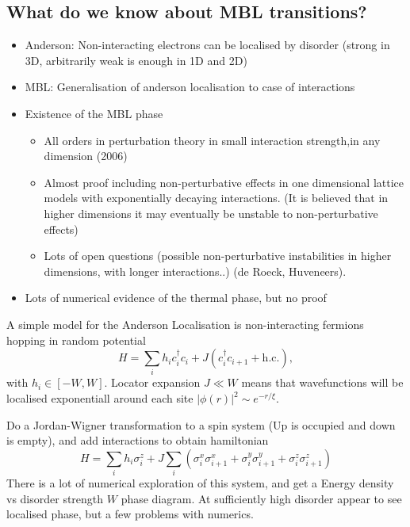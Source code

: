 \documentclass[a4paper]{article}
\begin{document}
\subsection{What do we know about MBL transitions?}
\begin{itemize}
    \item Anderson: Non-interacting electrons can be localised by disorder
        (strong in 3D, arbitrarily weak is enough in 1D and 2D)
    \item MBL: Generalisation of anderson localisation to case of interactions
    \item Existence of the MBL phase
        \begin{itemize}
            \item All orders in perturbation theory in small interaction
                strength,in any dimension (2006)
            \item Almost proof including non-perturbative effects in one
                dimensional lattice models with exponentially decaying
                interactions. (It is believed that in higher dimensions it may
                eventually be unstable to non-perturbative effects)
            \item Lots of open questions (possible non-perturbative
                instabilities in higher dimensions, with longer interactions..)
                (de Roeck, Huveneers).
        \end{itemize}
    \item Lots of numerical evidence of the thermal phase, but no proof
\end{itemize}
\begin{example}
    A simple model for the Anderson Localisation is non-interacting fermions
    hopping in random potential
    \[ H=\sum_i h_i c^\dagger_i c_i +J(c_i^\dagger c_{i+1} +\mathrm{h.c.}),\]
    with $h_i\in [-W,W]$. Locator expansion $J\ll W$ means that wavefunctions
    will be localised exponentiall around each site $|\phi(r)|^2\sim
    e^{-r/\xi}$.
\end{example}
\begin{example}
    Do a Jordan-Wigner transformation to a spin system (Up is occupied and down
    is empty), and add interactions to
    obtain hamiltonian
    \[
        H = \sum_i h_i\sigma_i^z +J\sum_i\left( \sigma_i^x\sigma_{i+1}^x
            +\sigma_i^y\sigma_{i+1}^y +\sigma_i^z\sigma_{i+1}^z\right)
    \]
    There is a lot of numerical exploration of this system, and get a Energy
    density vs disorder strength $W$ phase diagram. At sufficiently high
    disorder appear to see localised phase, but a few problems with numerics.
\end{example}
\end{document}
